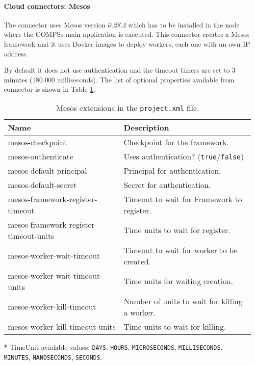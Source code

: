 \paragraph{Cloud connectors: Mesos}

The connector uses Mesos version \textit{0.28.2} which has to be installed in the node where the COMPSs main application is executed. 
This connector creates a Mesos framework and it uses Docker images to deploy workers, each one with an own IP address. 

By default it does not use authentication and the timeout timers are set to 3 minutes (180.000 milliseconds). The list of optional
properties available from connector is shown in Table \ref{tab:mesos_extensions}.

\begin{table}[!ht]
\def\arraystretch{1.2}
\centering
\begin{tabularx}{\linewidth}{|l|X|} \hline
	\textbf{Name} &\textbf{Description} \\ \hline
	mesos-checkpoint  & Checkpoint for the framework.\\ \hline
	mesos-authenticate & Uses authentication? (\texttt{true}/\texttt{false}) \\ \hline
	mesos-default-principal & Principal for authentication.\\ \hline
	mesos-default-secret  & Secret for authentication.\\ \hline
	mesos-framework-register-timeout & Timeout to wait for Framework to register.\\ \hline
	mesos-framework-register-timeout-units&  Time units to wait for register.\\ \hline
	mesos-worker-wait-timeout & Timeout to wait for worker to be created.\\ \hline
	mesos-worker-wait-timeout-units  & Time units for waiting creation. \\ \hline
	mesos-worker-kill-timeout  & Number of units to wait for killing a worker. \\ \hline
	mesos-worker-kill-timeout-units  & Time units to wait for killing.\\ \hline
\end{tabularx}
\caption{Mesos extensions in the \texttt{project.xml} file.}
\label{tab:mesos_extensions}
\end{table}

\newpage

\noindent
* TimeUnit avialable values: \texttt{DAYS}, \texttt{HOURS}, \texttt{MICROSECONDS}, \texttt{MILLISECONDS}, \texttt{MINUTES}, 
\texttt{NANOSECONDS}, \texttt{SECONDS}.
